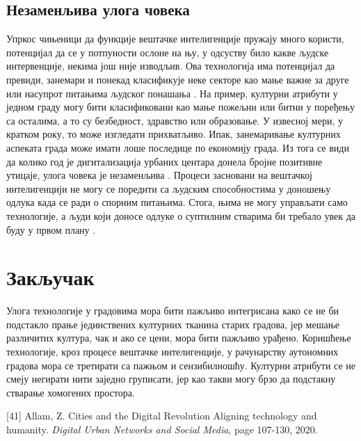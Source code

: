 \documentclass{article}
\begin{document}
\subsection{Незаменљива улога човека}
Упркос чињеници да функције вештачке интелигенције пружају много користи, потенцијал да се у потпуности ослоне на њу, у одсуству било какве људске интервенције, некима још није изводљив. Ова технологија има потенцијал да превиди, занемари и понекад класификује неке секторе као мање важне за друге или насупрот питањима људског понашања \cite{dubey}. На пример, културни атрибути у једном граду могу бити класификовани као мање пожељни или битни у поређењу са осталима, а то су безбедност, здравство или образовање. У извесној мери, у кратком року, то може изгледати прихватљиво. Ипак, занемаривање културних аспеката града може имати лоше последице по економију града. Из тога се види да колико год је дигитализација урбаних центара донела бројне позитивне утицаје, улога човека је незаменљива \cite{zorins}. Процеси засновани на вештачкој интелигенцији не могу се поредити са људским способностима у доношењу одлука када се ради о спорним питањима. Стога, њима не могу управљати само технологије, а људи који доносе одлуке о суптилним стварима би требало увек да буду у првом плану \cite{heh}.

\section{Закључак}

Улога технологије у градовима мора бити пажљиво интегрисана како се не би подстакло прање јединствених културних тканина старих градова, јер мешање различитих култура, чак и ако се цени, мора бити пажљиво урађено. Коришћење технологије, кроз процесе вештачке интелигенције, у рачунарству аутономних градова мора се третирати са пажњом и сензибилношћу. Културни атрибути се не смеју негирати нити заједно груписати, јер као такви могу брзо да подстакну стварање хомогених простора. 

\newpage

 

\vspace{-7}
\bibitem{} [41] \space Allam, Z. Cities and the  Digital  Revolution Aligning technology and humanity. \emph{Digital Urban Networks and Social Media}, page 107-130, 2020.
\end{document}
